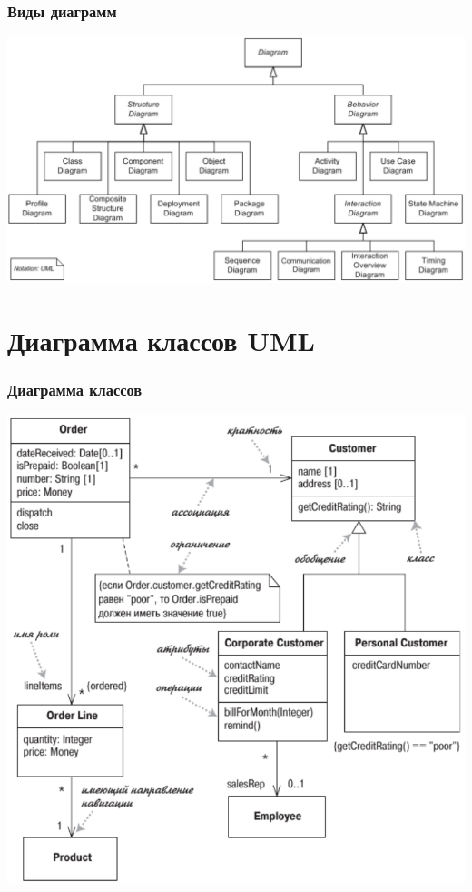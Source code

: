 \documentclass{../../slides-style}
\begin{document}
    \begin{frame}
        \frametitle{Виды диаграмм}
        \begin{center}
            \includegraphics[width=\textwidth]{umlDiagrams.png}
        \end{center}
    \end{frame}

    \section{Диаграмма классов UML}

    \begin{frame}
        \frametitle{Диаграмма классов}
        \begin{center}
            \includegraphics[height=0.8\textheight]{umlClassDiagram.png}
        \end{center}
    \end{frame}
\end{document}
